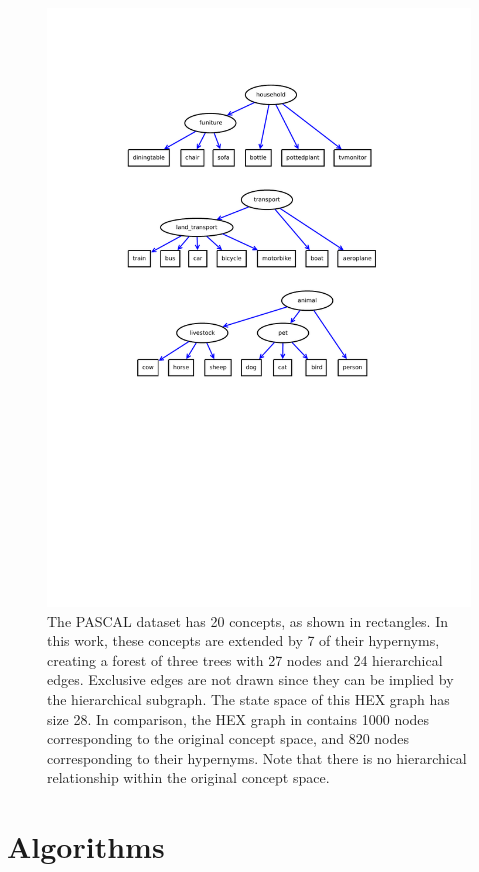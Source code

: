 \documentclass[11pt,a4paper]{book}
\begin{document}
\begin{figure}[p]
\centering
\includegraphics[scale=1.1]{full.pdf}
\caption{The PASCAL dataset has 20 concepts, as shown in rectangles. In this work, these concepts are extended by 7 of their hypernyms, creating a forest of three trees with 27 nodes and 24 hierarchical edges. Exclusive edges are not drawn since they can be implied by the hierarchical subgraph. The state space of this HEX graph has size 28. In comparison, the HEX graph in \cite{deng2014large} contains 1000 nodes corresponding to the original concept space, and 820 nodes corresponding to their hypernyms. Note that there is no hierarchical relationship within the original concept space.}
\label{fig:hex}
\end{figure}

\section{Algorithms}
\end{document}
